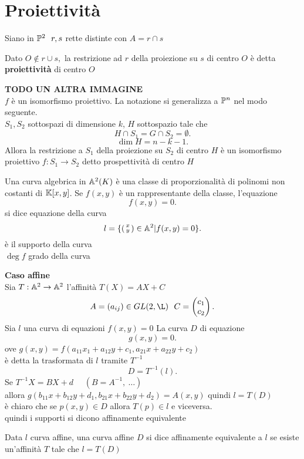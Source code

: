 \documentclass[12px]{article}
\begin{document}
 \section{Proiettività}
 Siano in $\mathbb{P}^2\ \ r,s$ rette distinte con $A = r\cap s$
  \begin{defi}
 	Dato $O\not\in r\cup s,$ la restrizione ad $r$ della proiezione su $s$ di centro $O$ è detta  \textbf{proiettività} di centro $O$
\end{defi}
\textbf{TODO UN ALTRA IMMAGINE}\\
$f$ è un isomorfismo proiettivo. La notazione si generalizza a $\mathbb{P}^n$ nel modo seguente.\\
$S_1,S_2$ sottospazi di dimensione $k$, $H$ sottospazio tale che \[
H\cap S_1 = G\cap S_2 = \emptyset
.\] 
\[
\dim H = n  - k - 1
.\] Allora la restrizione a $S_1$ della proiezione su $S_2$ di centro $H$ è un isomorfismo proiettivo $f: S_1 \rightarrow S_2 $ detto prospettività di centro $H$
\newpage
\begin{defi}
	Una curva algebrica in $\mathbb{A}^2(K)$ è una classe di proporzionalità di polinomi non costanti di  $\mathbb{K}[x,y]$. Se  $f(x,y)$ è un rappresentante della classe, l'equazione 
	\[
	f(x,y) = 0
	.\] si dice equazione della curva
	\[
		 l= \{\left(\begin{smallmatrix}x\\y\end{smallmatrix}\right)\in \mathbb{A}^2|f(x,y) = 0\}
	.\] è il supporto della curva\\
	$\deg f$ grado della curva
\end{defi}
\textbf{Caso affine}\\
Sia $T: \mathbb{A}^2 \rightarrow \mathbb{A}^2$ l'affinità $T(X) = AX + C$
 \[
	 A = (a_{ij})\in GL(2,\L) \ \ C = \matrice{c_1\\c_2}
.\] 
Sia $l$ una curva di equazioni $f(x,y) = 0$
La curva $D$ di equazione 
\[
g(x,y) =0 
.\] 
ove $g(x,y) = f(a_{11}x_1+a_{12}y+c_1,a_{21}x+a_{22}y+c_2)$ \\
è detta la trasformata di $l$ tramite $T^{-1}$
 \[
 D = T^{-1}(l)
.\] 
Se $T^{-1}X = BX + d$ \ \ $(B = A^{-1}, \ \ldots)$\\
allora  $g(b_{11}x + b_{12}y + d_1, b_{21}x+b_{22}y + d_2) = A(x,y)$
quindi $l = T(D)$\\
è chiaro che se  $p(x,y)\in D$ allora $T(p)\in l$ e viceversa.\\
quindi i supporti si dicono affinamente equivalente
\begin{defi}
	Data $l$ curva affine, una curva affine $D$  si dice affinamente equivalente a $l$ se esiste un'affinità $T$ tale che $l = T(D)$
\end{defi}
\end{document}

